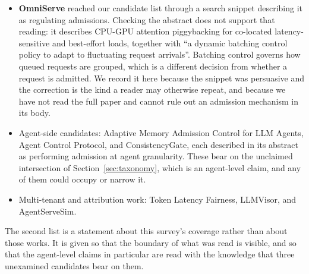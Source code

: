 \begin{itemize}[leftmargin=1.5em, itemsep=2pt]
\item \textbf{OmniServe} \citep{omniserve2026} reached our candidate
      list through a search snippet describing it as regulating
      admissions. Checking the abstract does not support that reading:
      it describes CPU-GPU attention piggybacking for co-located
      latency-sensitive and best-effort loads, together with ``a
      dynamic batching control policy to adapt to fluctuating request
      arrivals''. Batching control governs how queued requests are
      grouped, which is a different decision from whether a request is
      admitted. We record it here because the snippet was persuasive
      and the correction is the kind a reader may otherwise repeat,
      and because we have not read the full paper and cannot rule out
      an admission mechanism in its body.
\item Agent-side candidates: Adaptive Memory Admission Control for LLM
      Agents, Agent Control Protocol, and ConsistencyGate, each
      described in its abstract as performing admission at agent
      granularity. These bear on the unclaimed intersection of
      Section~\ref{sec:taxonomy}, which is an agent-level claim, and
      any of them could occupy or narrow it.
\item Multi-tenant and attribution work: Token Latency Fairness,
      LLMVisor, and AgentServeSim.
\end{itemize}

The second list is a statement about this survey's coverage rather than
about those works. It is given so that the boundary of what was read is
visible, and so that the agent-level claims in particular are read with
the knowledge that three unexamined candidates bear on them.

